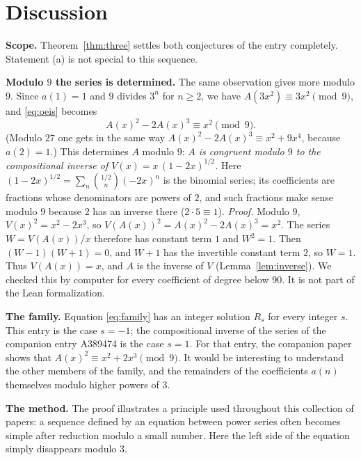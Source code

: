 \documentclass[11pt,a4paper]{article}
\theoremstyle{definition}
\theoremstyle{remark}
\newcommand{\para}[1]{\par\medskip\noindent\textbf{#1}\enspace}
\begin{document}
\section{Discussion}\label{sec:discussion}

\para{Scope.} Theorem~\ref{thm:three} settles both conjectures of the entry completely. Statement (a) is not special to
this sequence.

\para{Modulo $9$ the series is determined.} The same observation gives more modulo $9$. Since $a(1)=1$ and $9$ divides
$3^n$ for $n\ge2$, we have $A(3x^2)\equiv3x^2\pmod 9$, and \eqref{eq:oeis} becomes
\[
A(x)^2-2A(x)^3\equiv x^2\pmod 9 .
\]
(Modulo $27$ one gets in the same way $A(x)^2-2A(x)^3\equiv x^2+9x^4$, because $a(2)=1$.) This determines $A$ modulo
$9$: \emph{$A$ is congruent modulo $9$ to the compositional inverse of $V(x)=x\,(1-2x)^{1/2}$.} Here
$(1-2x)^{1/2}=\sum_n\binom{1/2}{n}(-2x)^n$ is the binomial series; its coefficients are fractions whose denominators are
powers of $2$, and such fractions make sense modulo $9$ because $2$ has an inverse there ($2\cdot5\equiv1$).
\emph{Proof.} Modulo $9$, $V(x)^2=x^2-2x^3$, so $V(A(x))^2=A(x)^2-2A(x)^3=x^2$. The series $W=V(A(x))/x$ therefore has
constant term $1$ and $W^2=1$. Then $(W-1)(W+1)=0$, and $W+1$ has the invertible constant term $2$, so $W=1$. Thus
$V(A(x))=x$, and $A$ is the inverse of $V$ (Lemma~\ref{lem:inverse}). We checked this by computer for every coefficient
of degree below $90$. It is not part of the Lean formalization.

\para{The family.} Equation \eqref{eq:family} has an integer solution $R_s$ for every integer $s$. This entry is the case
$s=-1$; the compositional inverse of the series of the companion entry A389474 is the case $s=1$. For that entry, the
companion paper shows that $A(x)^2\equiv x^2+2x^3\pmod 9$. It would be interesting to understand the other members of
the family, and the remainders of the coefficients $a(n)$ themselves modulo higher powers of $3$.

\para{The method.} The proof illustrates a principle used throughout this collection of papers: a sequence defined by an
equation between power series often becomes simple after reduction modulo a small number. Here the left side of the
equation simply disappears modulo $3$.
\end{document}
